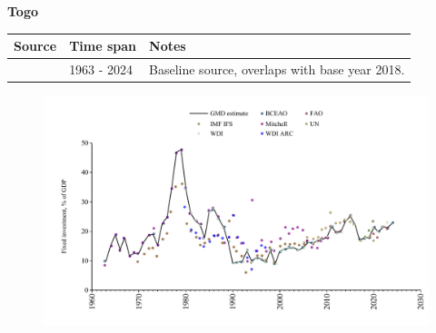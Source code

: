 \documentclass[12pt,a4paper,landscape]{article}
\begin{document}
\begin{adjustbox}{max totalsize={\paperwidth}{\paperheight},center}
\begin{minipage}[t][\textheight][t]{\textwidth}
\vspace*{0.5cm}
{}
\begin{center}
{\Large\bfseries Togo}
\end{center}
\vspace{0.5cm}
\begin{table}[H]
\centering
\small
\begin{tabular}{|l|l|l|}
\hline
\textbf{Source} & \textbf{Time span} & \textbf{Notes} \\
\hline
\rowcolor{white}\cite{BCEAO}& 1963 - 2024 &Baseline source, overlaps with base year 2018.\\
\hline
\end{tabular}
\end{table}
\begin{figure}[H]
\centering
\includegraphics[width=\textwidth,height=0.6\textheight,keepaspectratio]{graphs/TGO_finv_GDP.pdf}
\end{figure}
\end{minipage}
\end{adjustbox}
\end{document}
